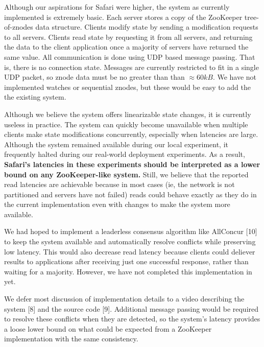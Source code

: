 Although our aspirations for Safari were higher, the system as currently implemented is extremely
basic. Each server stores a copy of the ZooKeeper tree-of-znodes data structure. Clients modify
state by sending a modification requests to all servers. Clients read state by requesting it from
all servers, and returning the data to the client application once a majority of servers have
returned the same value. All communication is done using UDP based message passing. That is, there
is no connection state. Messages are currently restricted to fit in a single UDP packet, so znode
data must be no greater than than $\approx 60kB$. We have not implemented watches or sequential
znodes, but these would be easy to add the the existing system.

Although we believe the system offers linearizable state changes, it is currently useless in
practice. The system can quickly become unavailable when multiple clients make state modifications
concurrently, especially when latencies are large. Although the system remained available during our
local experiment, it frequently halted during our real-world deployment experiments. As a result,
\textbf{Safari's latencies in these experiments should be interpreted as a lower bound on any
ZooKeeper-like system.} Still, we believe that the reported read latencies are achievable because in
most cases (ie, the network is not partitioned and servers have not failed) reads could behave
exactly as they do in the current implementation even with changes to make the system more
available.

We had hoped to implement a leaderless consensus algorithm like AllConcur [10] to keep the system
available and automatically resolve conflicts while preserving low latency. This would also decrease
read latency because clients could deliever results to applications after receiving just one
successful response, rather than waiting for a majority. However, we have not completed this
implementation in yet.

We defer most discussion of implementation details to a video describing the system [8] and the
source code [9]. Additional message passing would be required to resolve these conflicts when they
are detected, so the system's latency provides a loose lower bound on what could be expected from a
ZooKeeper implementation with the same consistency.
